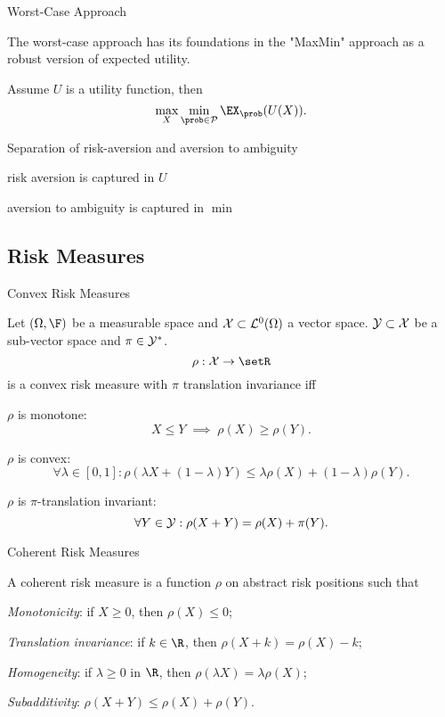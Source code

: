 
{Worst-Case Approach}
\item<1-> The worst-case approach has its foundations in the "MaxMin" approach as a robust version of expected utility. \item<2-> Assume $U$ is a utility function, then
$$
\max _X \min_{\prob \in {\cal P}} \EX_{\prob}(U(X)).
$$
\item<3-> Separation of risk-aversion and aversion to ambiguity
\item risk aversion is captured in $U$
\item aversion to ambiguity is captured in $\min$


\subsection{Risk Measures}

{Convex Risk Measures}

Let $(\Omega, \F)$ be a measurable space and ${\cal X} \subset {\cal L}^0(\Omega)$ a vector space. ${\cal Y} \subset {\cal X}$ be a sub-vector space and
$\pi \in {\cal Y}^*$.
\begin{equation}
\rho: {\cal X} \rightarrow \setR
\end{equation}
is a convex risk measure with $\pi$ translation invariance iff
\item $\rho$ is monotone: $$X \leq Y \;  \implies \; \rho(X) \geq \rho(Y).$$
\item $\rho$ is convex: $$\forall \lambda \in [0,1]: \rho(\lambda X + (1-\lambda) Y) \leq \lambda \rho(X) + (1-\lambda) \rho(Y).$$
\item $\rho$ is $\pi$-translation invariant: $$\forall Y \in {\cal Y}: \rho(X+Y) = \rho(X) + \pi(Y).$$

{Coherent Risk Measures}

A coherent risk measure is a function $\rho$ on abstract risk positions such that
\item<1-> \emph{Monotonicity}: if $X\geq 0$, then $\rho(X)\leq 0$;
\item<2-> \emph{Translation invariance}: if $k \in \R$, then
$\rho(X+k)=\rho(X)-k$;
\item<3-> \emph{Homogeneity}: if $\lambda \geq 0$ in $\R$, then $\rho(\lambda X)
= \lambda \rho (X)$;
\item<4-> \emph{Subadditivity}: $\rho(X+Y)\leq \rho(X)+\rho(Y)$.

